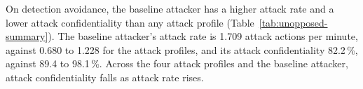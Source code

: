 \documentclass{cshonours}
\newcommand{\prelim}[1]{#1}
\begin{document}
On detection avoidance, the baseline attacker has a higher attack rate and a
lower attack confidentiality than any attack profile
(Table~\ref{tab:unopposed-summary}). The baseline attacker's attack rate is
\prelim{1.709} attack actions per minute, against \prelim{0.680} to
\prelim{1.228} for the attack profiles, and its attack confidentiality
\prelim{82.2}\,\%, against \prelim{89.4} to \prelim{98.1}\,\%. Across the four
attack profiles and the baseline attacker, attack confidentiality falls as
attack rate rises.
\end{document}
